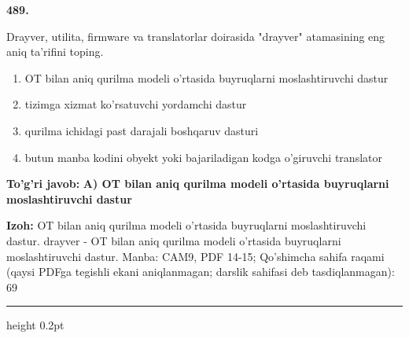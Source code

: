 \documentclass[10pt,a4paper]{article}
\begin{document}
{\bfseries\sffamily\color{ink} 489.}
\par
Drayver, utilita, firmware va translatorlar doirasida "drayver" atamasining eng aniq ta'rifini toping.
\begin{enumerate}[label=\Alph*),leftmargin=9mm]
\item OT bilan aniq qurilma modeli o'rtasida buyruqlarni moslashtiruvchi dastur
\item tizimga xizmat ko'rsatuvchi yordamchi dastur
\item qurilma ichidagi past darajali boshqaruv dasturi
\item butun manba kodini obyekt yoki bajariladigan kodga o'giruvchi translator
\end{enumerate}
\begin{tcolorbox}[enhanced,breakable,colback=teal!4,colframe=teal!60!black,boxrule=0.45pt,arc=1.2mm,left=2.7mm,right=2.7mm,top=1.8mm,bottom=1.8mm,before skip=2mm,after skip=2mm]
{\bfseries\sffamily\color{teal}To'g'ri javob:} \textbf{A) OT bilan aniq qurilma modeli o'rtasida buyruqlarni moslashtiruvchi dastur}
\par\smallskip
{\bfseries Izoh:} OT bilan aniq qurilma modeli o'rtasida buyruqlarni moslashtiruvchi dastur. drayver - OT bilan aniq qurilma modeli o'rtasida buyruqlarni moslashtiruvchi dastur. Manba: CAM9, PDF 14-15; Qo'shimcha sahifa raqami (qaysi PDFga tegishli ekani aniqlanmagan; darslik sahifasi deb tasdiqlanmagan): 69
\end{tcolorbox}
\vspace{2mm}\hrule height 0.2pt\vspace{3mm}
\end{document}
